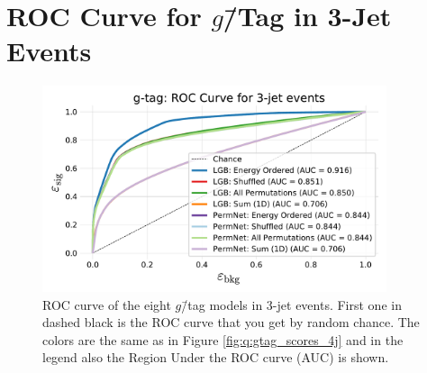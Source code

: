 \section[ROC Curve for g-Tag in 3-Jet Events]{ROC Curve for $g$\=/Tag in 3-Jet Events}
\begin{figure}[h!]
  \centerfloat
  \includegraphics[width=0.9\textwidth, trim=10 10 10 40, clip]{figures/quarks/gtag_ROC_3_jet-down_sample=1.00-ML_vars=vertex-selection=b-ejet_min=4-n_iter_RS_lgb=99-n_iter_RS_xgb=9-cdot_cut=0.90-version=19.pdf}
  \caption[ROC Curve for $g$\=/Tag in 3-Jet Events]
          {ROC curve of the eight $g$\=/tag models in 3-jet events. First one in dashed black is the ROC curve that you get by random chance. The colors are the same as in Figure \ref{fig:q:gtag_scores_4j} and in the legend also the Region Under the ROC curve (AUC) is shown.} 
          \label{fig:q:roc_gtag_3j}
\end{figure}
\clearpage





\FloatBarrier
